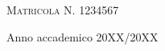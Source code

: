 \documentclass[12pt,a4paper,twoside,openright]{book}
\begin{document}
\begin{titlepage}
\begin{center}
\begin{flushright}
\textsc{Matricola N. 1234567}
\end{flushright}

\hfill
\vfill
 
{\small Anno accademico 20XX/20XX} 
\end{center}
\clearpage
\end{titlepage}
\end{document}

